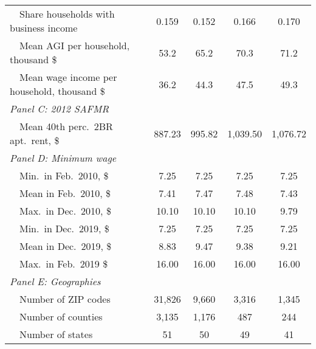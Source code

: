 \begin{landscape}
\begin{table}[hbt!]
\begin{tabular}{@{}lcccc@{}}
        $\quad$Share households with business income        & 0.159    & 0.152   & 0.166   & 0.170          \\
        $\quad$Mean AGI per household, thousand \$          & 53.2 & 65.2 & 70.3 & 71.2     \\
        $\quad$Mean wage income per household, thousand \$  & 36.2 & 44.3 & 47.5 & 49.3     \\
        \textit{Panel C: 2012 SAFMR}                        &       &       &        &               \\
        $\quad$Mean 40th perc.\ 2BR apt.\ rent, \$          & 887.23   & 995.82  & 1,039.50  & 1,076.72          \\
        \textit{Panel D: Minimum wage}                       &       &       &        &              \\
        $\quad$Min.\ in Feb.\ 2010, \$                      & 7.25   & 7.25  & 7.25  & 7.25         \\
        $\quad$Mean in Feb.\ 2010, \$                       & 7.41   & 7.47  & 7.48  & 7.43         \\
        $\quad$Max.\ in Dec.\ 2010, \$                      & 10.10   & 10.10  & 10.10  & 9.79         \\
        $\quad$Min.\ in Dec.\ 2019, \$                      & 7.25   & 7.25  & 7.25  & 7.25         \\
        $\quad$Mean in Dec.\ 2019, \$                       & 8.83   & 9.47  & 9.38  & 9.21         \\
        $\quad$Max.\ in Feb.\ 2019 \$                       & 16.00   & 16.00  & 16.00  & 16.00         \\
        \textit{Panel E: Geographies}                       &       &       &        &               \\
        $\quad$Number of ZIP codes                          & 31,826  & 9,660 & 3,316 & 1,345             \\
        $\quad$Number of counties                           & 3,135  & 1,176 & 487 & 244             \\
        $\quad$Number of states                             & 51  & 50 & 49 & 41             \\ \bottomrule
    \end{tabular}


\end{table}
\end{landscape}

